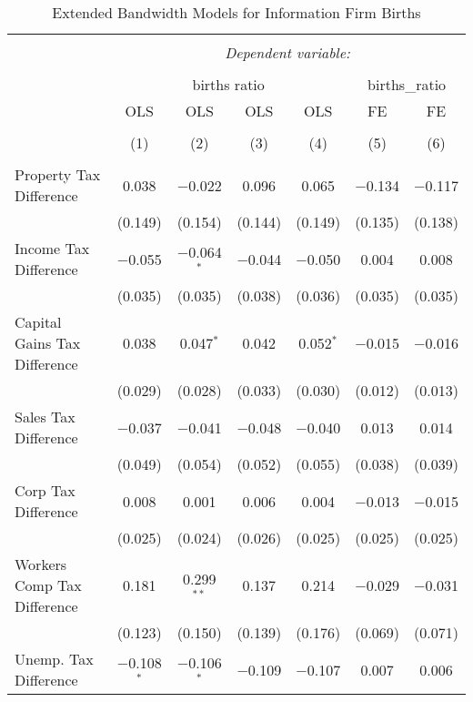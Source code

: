 
\begin{table}[!htbp] \centering 
  \caption{Extended Bandwidth Models for  Information Firm Births} 
  \label{51eb} 
\begin{tabular}{@{\extracolsep{5pt}}lcccccc} 
\\[-1.8ex]\hline 
\hline \\[-1.8ex] 
 & \multicolumn{6}{c}{\textit{Dependent variable:}} \\ 
\cline{2-7} 
\\[-1.8ex] & \multicolumn{4}{c}{births ratio} & \multicolumn{2}{c}{births\_ratio} \\ 
 & OLS & OLS & OLS & OLS & FE & FE \\ 
\\[-1.8ex] & (1) & (2) & (3) & (4) & (5) & (6)\\ 
\hline \\[-1.8ex] 
 Property Tax Difference & 0.038 & $-$0.022 & 0.096 & 0.065 & $-$0.134 & $-$0.117 \\ 
  & (0.149) & (0.154) & (0.144) & (0.149) & (0.135) & (0.138) \\ 
  Income Tax Difference & $-$0.055 & $-$0.064$^{*}$ & $-$0.044 & $-$0.050 & 0.004 & 0.008 \\ 
  & (0.035) & (0.035) & (0.038) & (0.036) & (0.035) & (0.035) \\ 
  Capital Gains Tax Difference & 0.038 & 0.047$^{*}$ & 0.042 & 0.052$^{*}$ & $-$0.015 & $-$0.016 \\ 
  & (0.029) & (0.028) & (0.033) & (0.030) & (0.012) & (0.013) \\ 
  Sales Tax Difference & $-$0.037 & $-$0.041 & $-$0.048 & $-$0.040 & 0.013 & 0.014 \\ 
  & (0.049) & (0.054) & (0.052) & (0.055) & (0.038) & (0.039) \\ 
  Corp Tax Difference & 0.008 & 0.001 & 0.006 & 0.004 & $-$0.013 & $-$0.015 \\ 
  & (0.025) & (0.024) & (0.026) & (0.025) & (0.025) & (0.025) \\ 
  Workers Comp Tax Difference & 0.181 & 0.299$^{**}$ & 0.137 & 0.214 & $-$0.029 & $-$0.031 \\ 
  & (0.123) & (0.150) & (0.139) & (0.176) & (0.069) & (0.071) \\ 
  Unemp. Tax Difference & $-$0.108$^{*}$ & $-$0.106$^{*}$ & $-$0.109 & $-$0.107 & 0.007 & 0.006 \\ 

\end{tabular}
\end{table}

